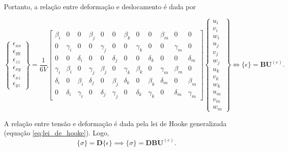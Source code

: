 Portanto, a relação entre deformação e deslocamento é dada por

\begin{equation}
    \begin{Bmatrix}
        \epsilon_{xx} \\ \epsilon_{yy} \\ \epsilon_{zz} \\ \epsilon_{xy} \\ \epsilon_{xz} \\ \epsilon_{yz}
    \end{Bmatrix} = \frac{1}{6V} \begin{bmatrix}
        \beta_i & 0 & 0 & \beta_j & 0 & 0 & \beta_k & 0 & 0 & \beta_m & 0 & 0 \\
        0 & \gamma_i & 0 & 0 & \gamma_j & 0 & 0 & \gamma_k & 0 & 0 & \gamma_m & 0 \\
        0 & 0 & \delta_i & 0 & 0 & \delta_j & 0 & 0 & \delta_k & 0 & 0 & \delta_m \\
        \gamma_i & \beta_i & 0 & \gamma_j & \beta_j & 0 & \gamma_k & \beta_k & 0 & \gamma_m & \beta_m & 0 \\
        \delta_i & 0 & \beta_i & \delta_j & 0 & \beta_j & \delta_k & 0 & \beta_k & \delta_m & 0 & \beta_m \\
        0 & \delta_i & \gamma_i & 0 & \delta_j & \gamma_j & 0 & \delta_k & \gamma_k & 0 & \delta_m & \gamma_m
    \end{bmatrix}
    \begin{Bmatrix}
        u_i \\ v_i \\ w_i \\ u_j \\ v_j \\ w_j \\ u_k \\ v_k \\ w_k \\ u_m \\ v_m \\ w_m
    \end{Bmatrix} \iff \{\epsilon\} = \bm{B} \bm{U}^{(e)}.
\end{equation}

A relação entre tensão e deformação é dada pela lei de Hooke generalizada (equação \ref{eq:lei_de_hooke}). Logo,
\begin{equation}
    \{\sigma\} = \bm{D} \{\epsilon\} \implies \{\sigma\} = \bm{D} \bm{B} \bm{U}^{(e)}.
\end{equation}

